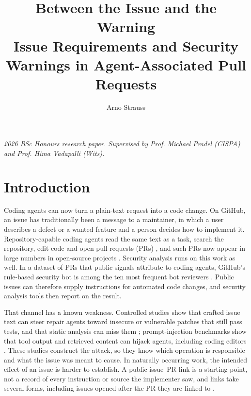 \documentclass[acmsmall,screen,nonacm]{acmart}
\title[Between the Issue and the Warning]{Between the Issue and the Warning\texorpdfstring{\\[0.25em]}{ }Issue Requirements and Security Warnings in Agent-Associated Pull Requests}
\author{Arno Strauss}
\affiliation{\institution{School of Computer Science and Applied Mathematics, University of the Witwatersrand}\city{Johannesburg}\country{South Africa}}
\begin{document}
\maketitle
\raggedbottom
\noindent\textit{2026 BSc Honours research paper. Supervised by Prof. Michael Pradel (CISPA) and Prof. Hima Vadapalli (Wits).}

\section{Introduction}

Coding agents can now turn a plain-text request into a code change. On GitHub, an issue has traditionally been a message to a maintainer, in which a user describes a defect or a wanted feature and a person decides how to implement it. Repository-capable coding agents read the same text as a task, search the repository, edit code and open pull requests (PRs) \cite{b9,b20,b22,b25}, and such PRs now appear in large numbers in open-source projects \cite{b11,b21}. Security analysis runs on this work as well. In a dataset of PRs that public signals attribute to coding agents, GitHub's rule-based security bot is among the ten most frequent bot reviewers \cite{b11}. Public issues can therefore supply instructions for automated code changes, and security analysis tools then report on the result.

That channel has a known weakness. Controlled studies show that crafted issue text can steer repair agents toward insecure or vulnerable patches that still pass tests, and that static analysis can miss them \cite{b3,b16}; prompt-injection benchmarks show that tool output and retrieved content can hijack agents, including coding editors \cite{b6,b12,b24}. These studies construct the attack, so they know which operation is responsible and what the issue was meant to cause. In naturally occurring work, the intended effect of an issue is harder to establish. A public issue--PR link is a starting point, not a record of every instruction or source the implementer saw, and links take several forms, including issues opened after the PR they are linked to \cite{b5}.
\end{document}
